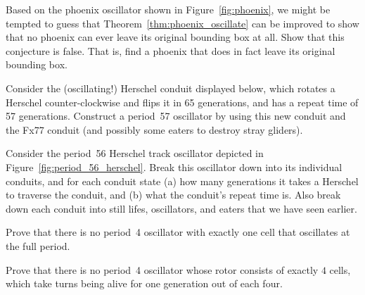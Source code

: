 \begin{multicols}{2}
	\mfilbreak
	
	
	\begin{problemstar}\label{exer:phoenix_bb} 
		Based on the phoenix oscillator shown in Figure~\ref{fig:phoenix}, we might be tempted to guess that Theorem~\ref{thm:phoenix_oscillate} can be improved to show that no phoenix can ever leave its original bounding box at all. Show that this conjecture is false. That is, find a phoenix that does in fact leave its original bounding box.
	\end{problemstar}
	
	
	\mfilbreak
	
	
	\begin{problem}\label{exer:period_57_herschel} 
		Consider the (oscillating!) Herschel conduit displayed below, which rotates a Herschel counter-clockwise and flips it in 65 generations, and has a repeat time of 57 generations. Construct a period~57 oscillator by using this new conduit and the Fx77 conduit (and possibly some eaters to destroy stray gliders).
		\begin{center}
		\end{center}
	\end{problem}
	
	
	\mfilbreak
	
	
	\begin{problem}\label{exer:period_56_herschel} 
		Consider the period~56 Herschel track oscillator depicted in Figure~\ref{fig:period_56_herschel}. Break this oscillator down into its individual conduits, and for each conduit state (a) how many generations it takes a Herschel to traverse the conduit, and (b) what the conduit's repeat time is. Also break down each conduit into still lifes, oscillators, and eaters that we have seen earlier.
	\end{problem}
	
	
	\mfilbreak
	
	
	\begin{problemstar}\label{exer:p4_oscillator} 
		Prove that there is no period~4 oscillator with exactly one cell that oscillates at the full period.
	\end{problemstar}


	\mfilbreak
	
	
	\begin{problem}\label{exer:p4_oscillator_impb} 
		Prove that there is no period~4 oscillator whose rotor consists of exactly $4$ cells, which take turns being alive for one generation out of each four.
	\end{problem}
	

\end{multicols}
